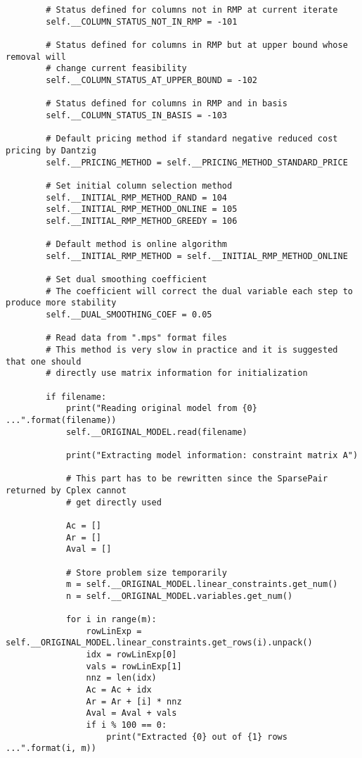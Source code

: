 \documentclass{article}
\begin{document}
\begin{lstlisting}
        # Status defined for columns not in RMP at current iterate
        self.__COLUMN_STATUS_NOT_IN_RMP = -101

        # Status defined for columns in RMP but at upper bound whose removal will 
        # change current feasibility
        self.__COLUMN_STATUS_AT_UPPER_BOUND = -102

        # Status defined for columns in RMP and in basis
        self.__COLUMN_STATUS_IN_BASIS = -103

        # Default pricing method if standard negative reduced cost pricing by Dantzig
        self.__PRICING_METHOD = self.__PRICING_METHOD_STANDARD_PRICE

        # Set initial column selection method
        self.__INITIAL_RMP_METHOD_RAND = 104
        self.__INITIAL_RMP_METHOD_ONLINE = 105
        self.__INITIAL_RMP_METHOD_GREEDY = 106

        # Default method is online algorithm
        self.__INITIAL_RMP_METHOD = self.__INITIAL_RMP_METHOD_ONLINE

        # Set dual smoothing coefficient
        # The coefficient will correct the dual variable each step to produce more stability
        self.__DUAL_SMOOTHING_COEF = 0.05

        # Read data from ".mps" format files
        # This method is very slow in practice and it is suggested that one should
        # directly use matrix information for initialization

        if filename:
            print("Reading original model from {0} ...".format(filename))
            self.__ORIGINAL_MODEL.read(filename)

            print("Extracting model information: constraint matrix A")

            # This part has to be rewritten since the SparsePair returned by Cplex cannot 
            # get directly used

            Ac = []
            Ar = []
            Aval = []

            # Store problem size temporarily
            m = self.__ORIGINAL_MODEL.linear_constraints.get_num()
            n = self.__ORIGINAL_MODEL.variables.get_num()

            for i in range(m):
                rowLinExp = self.__ORIGINAL_MODEL.linear_constraints.get_rows(i).unpack()
                idx = rowLinExp[0]
                vals = rowLinExp[1]
                nnz = len(idx)
                Ac = Ac + idx
                Ar = Ar + [i] * nnz
                Aval = Aval + vals
                if i % 100 == 0:
                    print("Extracted {0} out of {1} rows ...".format(i, m))


\end{lstlisting}
\end{document}
